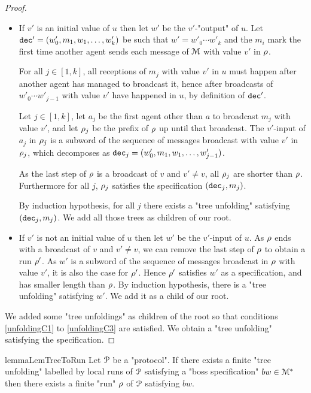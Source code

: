 \begin{proof}
	\begin{itemize}
		\item If $v'$ is an initial value of $u$ then let $w'$ be the $v'$-"output" of $u$. Let $\mathtt{dec}' = (w'_0, m_1, w_1, \ldots, w'_k)$ be such that $w' = w'_0 \cdots w'_k$ and the $m_i$ mark the first time another agent sends each message of $\mathcal{M}$ with value $v'$ in $\rho$.  
		
		For all $j \in [1,k]$, all receptions of $m_j$ with value $v'$ in $u$ must happen after another agent has managed to broadcast it, hence after broadcasts of $w'_0 \cdots w'_{j-1}$ with value $v'$ have happened in $u$, by definition of $\mathtt{dec}'$.
		
		Let $j \in [1,k]$, let $a_j$ be the first agent other than $a$ to broadcast $m_j$ with value $v'$, and let $\rho_j$ be the prefix of $\rho$ up until that broadcast. The $v'$-input of $a_j$ in $\rho_j$ is a subword of the sequence of messages broadcast with value $v'$ in $\rho_j$, which decomposes as $\mathtt{dec}_j = (w'_0, m_1, w_1, \ldots, w'_{j-1})$.
		
		As the last step of $\rho$ is a broadcast of $v$ and $v' \neq v$, all $\rho_j$ are shorter than $\rho$. Furthermore for all $j$, $\rho_j$ satisfies the specification $(\mathtt{dec}_j, m_j)$.		
		
		By induction hypothesis, for all $j$ there exists a "tree unfolding" satisfying $(\mathtt{dec}_j, m_j)$. We add all those trees as children of our root.
		
		\item If $v'$ is not an initial value of $u$ then let $w'$ be the $v'$-input of $u$. 
		 As $\rho$ ends with a broadcast of $v$ and $v' \neq v$, we can remove the last step of $\rho$ to obtain a run $\rho'$. As $w'$ is a subword of the sequence of messages broadcast in $\rho$ with value $v'$, it is also the case for $\rho'$.
		 Hence $\rho'$ satisfies $w'$ as a specification, and has smaller length than $\rho$. By induction hypothesis, there is a "tree unfolding" satisfying $w'$. We add it as a child of our root.
	\end{itemize}
	
	We added some "tree unfoldings" as children of the root so that conditions \ref{unfoldingC1} to \ref{unfoldingC3} are satisfied. We obtain a "tree unfolding" satisfying the specification.
\end{proof}
\fi



\begin{restatable}{lemma}{LemTreeToRun}
	\label{lem:tree-to-run}
	Let $\mathcal{P}$ be a "protocol".
	If there exists a finite "tree unfolding" labelled by local runs of $\mathcal{P}$ satisfying a "boss specification" $bw \in \mathcal{M}^*$ then there exists  a finite "run" $\rho$ of $\mathcal{P}$ satisfying $bw$.
\end{restatable}

